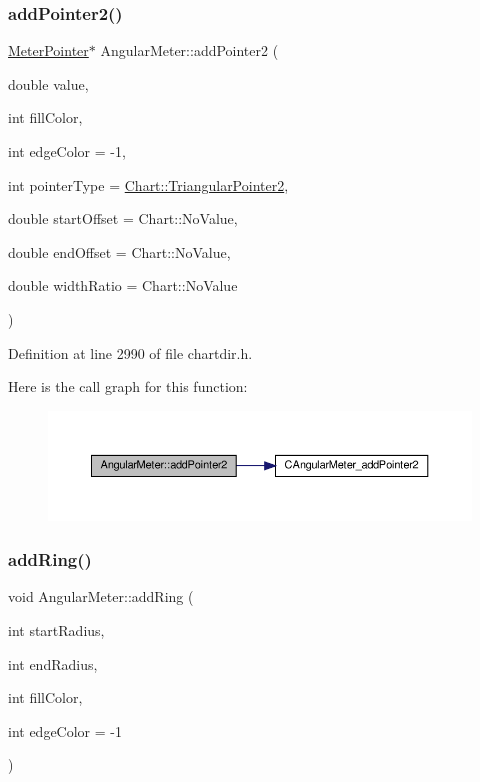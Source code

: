 \subsubsection{\texorpdfstring{add\+Pointer2()}{addPointer2()}}
{\footnotesize\ttfamily \hyperlink{class_meter_pointer}{Meter\+Pointer}$\ast$ Angular\+Meter\+::add\+Pointer2 (\begin{DoxyParamCaption}\item[{double}]{value,  }\item[{int}]{fill\+Color,  }\item[{int}]{edge\+Color = {\ttfamily -\/1},  }\item[{int}]{pointer\+Type = {\ttfamily \hyperlink{namespace_chart_a15cfe53d27f5b7a07e25af504b5d10f4afd0736ae83f260af5c7f8093d24448f1}{Chart\+::\+Triangular\+Pointer2}},  }\item[{double}]{start\+Offset = {\ttfamily Chart\+:\+:NoValue},  }\item[{double}]{end\+Offset = {\ttfamily Chart\+:\+:NoValue},  }\item[{double}]{width\+Ratio = {\ttfamily Chart\+:\+:NoValue} }\end{DoxyParamCaption})\hspace{0.3cm}{\ttfamily [inline]}}



Definition at line 2990 of file chartdir.\+h.

Here is the call graph for this function\+:
\nopagebreak
\begin{figure}[H]
\begin{center}
\leavevmode
\includegraphics[width=350pt]{class_angular_meter_a50942d4bfc5e84f9532784e6d41c9ec1_cgraph}
\end{center}
\end{figure}
\mbox{\label{class_angular_meter_a67b26ec28b68cac7b13922d61d2a36c9}} 
\subsubsection{\texorpdfstring{add\+Ring()}{addRing()}}
{\footnotesize\ttfamily void Angular\+Meter\+::add\+Ring (\begin{DoxyParamCaption}\item[{int}]{start\+Radius,  }\item[{int}]{end\+Radius,  }\item[{int}]{fill\+Color,  }\item[{int}]{edge\+Color = {\ttfamily -\/1} }\end{DoxyParamCaption})\hspace{0.3cm}{\ttfamily [inline]}}



